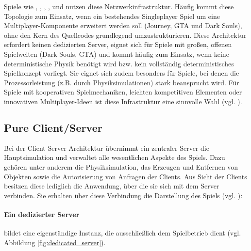 Spiele wie , , , ,  und  nutzen diese Netzwerkinfrastruktur. Häufig kommt diese Topologie zum Einsatz, wenn ein bestehendes Singleplayer Spiel um eine Multiplayer-Komponente erweitert werden soll (Journey, GTA und Dark Souls), ohne den Kern des Quellcodes grundlegend umzustrukturieren. Diese Architektur erfordert keinen dedizierten Server, eignet sich für Spiele mit großen, offenen Spielwelten (Dark Souls, GTA) und kommt häufig zum Einsatz, wenn keine deterministische Physik benötigt wird bzw. kein vollständig deterministisches Spielkonzept vorliegt. Sie eignet sich zudem besonders für Spiele, bei denen die Prozessorleistung (z.B. durch Physiksimulationen) stark beansprucht wird. Für Spiele mit kooperativen Spielmechaniken, leichten kompetitiven Elementen oder innovativen Multiplayer-Ideen ist diese Infrastruktur eine sinnvolle Wahl (vgl. \citealp{noauthor_choosing_2024}).

\subsection{Pure Client/Server}
Bei der Client-Server-Architektur übernimmt ein zentraler Server die Hauptsimulation und verwaltet alle wesentlichen Aspekte des Spiels. Dazu gehören unter anderem die Physiksimulation, das Erzeugen und Entfernen von Objekten sowie die Autorisierung von Anfragen der Clients. Aus Sicht der Clients besitzen diese lediglich die Anwendung, über die sie sich mit dem Server verbinden. Sie erhalten über diese Verbindung die Darstellung des Spiels (vgl. \citealp{noauthor_client-server_2024}):
\paragraph{Ein dedizierter Server} bildet eine eigenständige Instanz, die ausschließlich dem Spielbetrieb dient (vgl. Abbildung \ref{fig:dedicated_server}).

